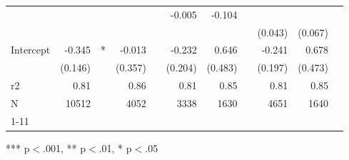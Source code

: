 \documentclass{article}
\begin{document}
\begin{table}[!h]
\begin{tabular}{lllllllllll}
  \multicolumn{1}{r}{} &
  \multicolumn{1}{l}{} &
  \multicolumn{1}{r}{} &
  \multicolumn{1}{r}{} &
  \multicolumn{1}{l}{} &
  \multicolumn{1}{r}{-0.005} &
  \multicolumn{1}{r}{-0.104} &
  \multicolumn{1}{l}{} \\
\multicolumn{1}{l}{} &
  \multicolumn{1}{r}{} &
  \multicolumn{1}{l}{} &
  \multicolumn{1}{r}{} &
  \multicolumn{1}{l}{} &
  \multicolumn{1}{r}{} &
  \multicolumn{1}{r}{} &
  \multicolumn{1}{l}{} &
  \multicolumn{1}{r}{(0.043)} &
  \multicolumn{1}{r}{(0.067)} &
  \multicolumn{1}{l}{} \\
\multicolumn{1}{l}{Intercept} &
  \multicolumn{1}{r}{-0.345} &
  \multicolumn{1}{l}{*} &
  \multicolumn{1}{r}{-0.013} &
  \multicolumn{1}{l}{} &
  \multicolumn{1}{r}{-0.232} &
  \multicolumn{1}{r}{0.646} &
  \multicolumn{1}{l}{} &
  \multicolumn{1}{r}{-0.241} &
  \multicolumn{1}{r}{0.678} &
  \multicolumn{1}{l}{} \\
\multicolumn{1}{l}{} &
  \multicolumn{1}{r}{(0.146)} &
  \multicolumn{1}{l}{} &
  \multicolumn{1}{r}{(0.357)} &
  \multicolumn{1}{l}{} &
  \multicolumn{1}{r}{(0.204)} &
  \multicolumn{1}{r}{(0.483)} &
  \multicolumn{1}{l}{} &
  \multicolumn{1}{r}{(0.197)} &
  \multicolumn{1}{r}{(0.473)} &
  \multicolumn{1}{l}{} \\
\multicolumn{1}{l}{r2} &
  \multicolumn{1}{r}{0.81} &
  \multicolumn{1}{l}{} &
  \multicolumn{1}{r}{0.86} &
  \multicolumn{1}{l}{} &
  \multicolumn{1}{r}{0.81} &
  \multicolumn{1}{r}{0.85} &
  \multicolumn{1}{l}{} &
  \multicolumn{1}{r}{0.81} &
  \multicolumn{1}{r}{0.85} &
  \multicolumn{1}{l}{} \\
\multicolumn{1}{l}{N} &
  \multicolumn{1}{r}{10512} &
  \multicolumn{1}{l}{} &
  \multicolumn{1}{r}{4052} &
  \multicolumn{1}{l}{} &
  \multicolumn{1}{r}{3338} &
  \multicolumn{1}{r}{1630} &
  \multicolumn{1}{l}{} &
  \multicolumn{1}{r}{4651} &
  \multicolumn{1}{r}{1640} &
  \multicolumn{1}{l}{} \\
\cline{1-11}
\end{tabular}

\footnotesize{
*** p$<$.001, ** p$<$.01, * p$<$.05
}
\end{table}
\end{document}
